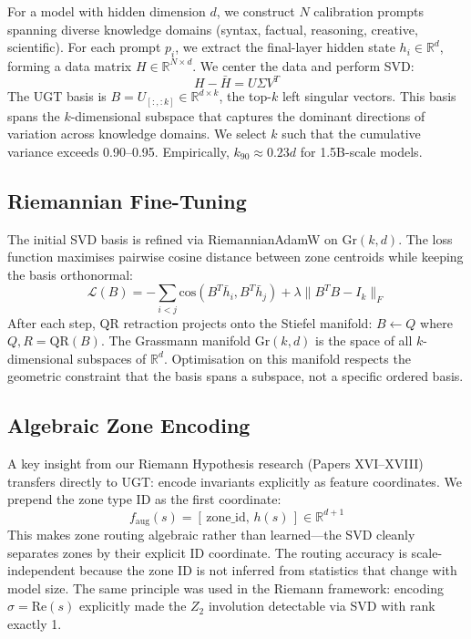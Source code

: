 \documentclass[11pt,a4paper]{article}
\begin{document}
For a model with hidden dimension $d$, we construct $N$ calibration prompts spanning diverse knowledge domains (syntax, factual, reasoning, creative, scientific). For each prompt $p_i$, we extract the final-layer hidden state $h_i \in \mathbb{R}^d$, forming a data matrix $H \in \mathbb{R}^{N \times d}$. We center the data and perform SVD:
\begin{equation}
H - \bar{H} = U \Sigma V^T
\end{equation}
The UGT basis is $B = U_{[:,:k]} \in \mathbb{R}^{d \times k}$, the top-$k$ left singular vectors. This basis spans the $k$-dimensional subspace that captures the dominant directions of variation across knowledge domains. We select $k$ such that the cumulative variance exceeds 0.90--0.95. Empirically, $k_{90} \approx 0.23d$ for 1.5B-scale models.

\subsection{Riemannian Fine-Tuning}

The initial SVD basis is refined via RiemannianAdamW on $\mathrm{Gr}(k,d)$. The loss function maximises pairwise cosine distance between zone centroids while keeping the basis orthonormal:
\begin{equation}
\mathcal{L}(B) = -\sum_{i < j} \mathrm{cos}(B^T \bar{h}_i, B^T \bar{h}_j) + \lambda \|B^T B - I_k\|_F
\end{equation}
After each step, QR retraction projects onto the Stiefel manifold: $B \leftarrow Q$ where $Q,R = \mathrm{QR}(B)$. The Grassmann manifold $\mathrm{Gr}(k,d)$ is the space of all $k$-dimensional subspaces of $\mathbb{R}^d$. Optimisation on this manifold respects the geometric constraint that the basis spans a subspace, not a specific ordered basis.

\subsection{Algebraic Zone Encoding}

A key insight from our Riemann Hypothesis research (Papers XVI--XVIII) transfers directly to UGT: encode invariants explicitly as feature coordinates. We prepend the zone type ID as the first coordinate:
\begin{equation}
f_{\mathrm{aug}}(s) = [\, \mathrm{zone\_id},\, h(s) \,] \in \mathbb{R}^{d+1}
\end{equation}
This makes zone routing algebraic rather than learned---the SVD cleanly separates zones by their explicit ID coordinate. The routing accuracy is scale-independent because the zone ID is not inferred from statistics that change with model size. The same principle was used in the Riemann framework: encoding $\sigma = \mathrm{Re}(s)$ explicitly made the $Z_2$ involution detectable via SVD with rank exactly 1.
\end{document}
